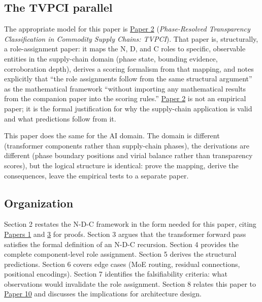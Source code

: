 \documentclass[12pt]{article}
\begin{document}
\subsection{The TVPCI parallel}\label{the-tvpci-parallel}

The appropriate model for this paper is
\href{https://github.com/baardev/truevalue/blob/main/docnav/Research/papers/2_supply-chain-transparency-tvpci/2_supply-chain-transparency-tvpci.pdf}{Paper
2} (\emph{Phase-Resolved Transparency Classification in Commodity Supply
Chains: TVPCI}). That paper is, structurally, a role-assignment paper:
it maps the N, D, and C roles to specific, observable entities in the
supply-chain domain (phase state, bounding evidence, corroboration
depth), derives a scoring formalism from that mapping, and notes
explicitly that ``the role assignments follow from the same structural
argument'' as the mathematical framework ``without importing any
mathematical results from the companion paper into the scoring rules.''
\href{https://github.com/baardev/truevalue/blob/main/docnav/Research/papers/2_supply-chain-transparency-tvpci/2_supply-chain-transparency-tvpci.pdf}{Paper
2} is not an empirical paper; it is the formal justification for why the
supply-chain application is valid and what predictions follow from it.

This paper does the same for the AI domain. The domain is different
(transformer components rather than supply-chain phases), the
derivations are different (phase boundary positions and virial balance
rather than transparency scores), but the logical structure is
identical: prove the mapping, derive the consequences, leave the
empirical tests to a separate paper.

\subsection{Organization}\label{organization}

Section 2 restates the N-D-C framework in the form needed for this
paper, citing
\href{https://github.com/baardev/truevalue/blob/main/docnav/Research/papers/1_recursive-tholonic-five-constants/1_recursive-tholonic-five-constants.pdf}{Papers
1} and
\href{https://github.com/baardev/truevalue/blob/main/docnav/Research/papers/3_minimal-recursive-triadic-framework/3_minimal-recursive-triadic-framework.pdf}{3}
for proofs. Section 3 argues that the transformer forward pass satisfies
the formal definition of an N-D-C recursion. Section 4 provides the
complete component-level role assignment. Section 5 derives the
structural predictions. Section 6 covers edge cases (MoE routing,
residual connections, positional encodings). Section 7 identifies the
falsifiability criteria: what observations would invalidate the role
assignment. Section 8 relates this paper to
\href{https://github.com/baardev/truevalue/blob/main/docnav/Research/papers/10_tholonic-neural-architecture/10_tholonic-neural-architecture.pdf}{Paper
10} and discusses the implications for architecture design.
\end{document}
